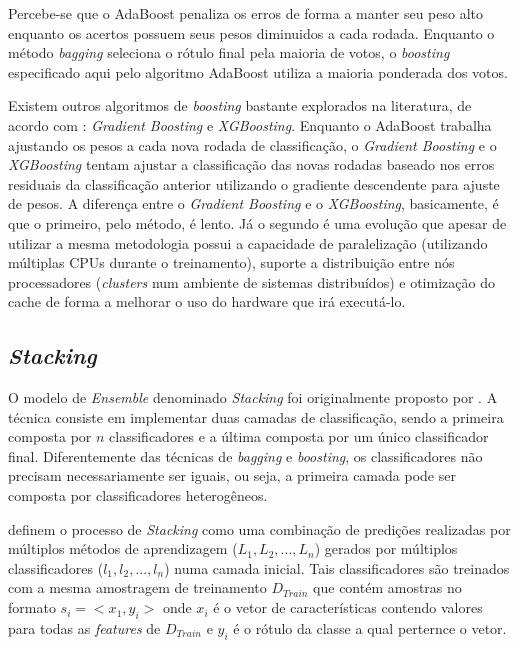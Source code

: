 Percebe-se que o AdaBoost penaliza os erros de forma a manter seu peso alto enquanto os acertos possuem seus pesos diminuidos a cada rodada. Enquanto o método \textit{bagging} seleciona o rótulo final pela maioria de votos, o \textit{boosting} especificado aqui pelo algoritmo AdaBoost utiliza a maioria ponderada dos votos.

Existem outros algoritmos de \textit{boosting} bastante explorados na literatura, de acordo com : \textit{Gradient Boosting} e \textit{XGBoosting}. Enquanto o AdaBoost trabalha ajustando os pesos a cada nova rodada de classificação, o \textit{Gradient Boosting} e o \textit{XGBoosting} tentam ajustar a classificação das novas rodadas baseado nos erros residuais da classificação anterior utilizando o gradiente descendente para ajuste de pesos. A diferença entre o \textit{Gradient Boosting} e o \textit{XGBoosting}, basicamente, é que o primeiro, pelo método, é lento. Já o segundo é uma evolução que apesar de utilizar a mesma metodologia possui a capacidade de paralelização (utilizando múltiplas CPUs durante o treinamento), suporte a distribuição entre nós processadores (\textit{clusters} num ambiente de sistemas distribuídos) e otimização do cache de forma a melhorar o uso do hardware que irá executá-lo.

\subsection{\textit{Stacking}}

O modelo de \textit{Ensemble} denominado \textit{Stacking} foi originalmente proposto por . A técnica consiste em implementar duas camadas de classificação, sendo a primeira composta por $n$ classificadores e a última composta por um único classificador final. Diferentemente das técnicas de \textit{bagging} e \textit{boosting}, os classificadores não precisam necessariamente ser iguais, ou seja, a primeira camada pode ser composta por classificadores heterogêneos.

 definem o processo de \textit{Stacking} como uma combinação de predições realizadas por múltiplos métodos de aprendizagem ($L_1, L_2, ..., L_n$) gerados por múltiplos classificadores ($l_1, l_2, ..., l_n$) numa camada inicial. Tais classificadores são treinados com a mesma amostragem de treinamento $D_{Train}$ que contém amostras no formato $s_i = <x_1, y_i>$ onde $x_i$ é o vetor de características contendo valores para todas as \textit{features} de $D_{Train}$ e $y_i$ é o rótulo da classe a qual perternce o vetor.

